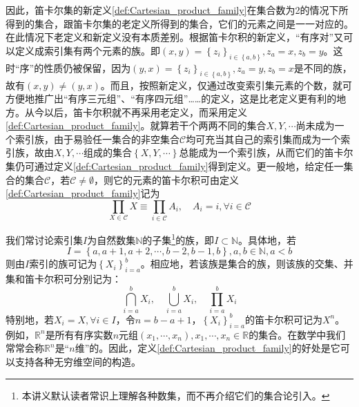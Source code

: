 \documentclass[../main.tex]{subfiles}
\begin{document}

因此，笛卡尔集的新定义\ref{def:Cartesian_product_family}在集合数为2的情况下所得到的集合，跟笛卡尔集的老定义所得到的集合，它们的元素之间是一一对应的。在此情况下老定义和新定义没有本质差别。根据笛卡尔积的新定义，“有序对”又可以定义成索引集有两个元素的族。即$\left(x,y\right)=\left\{z_i\right\}_{i\in\left\{a,b\right\}},z_a=x,z_b=y$。这时“序”的性质仍被保留，因为$\left(y,x\right)=\left\{z_i\right\}_{i\in\left\{a,b\right\}},z_a=y,z_b=x$是不同的族，故有$\left(x,y\right)\neq\left(y,x\right)$。而且，按照新定义，仅通过改变索引集元素的个数，就可方便地推广出“有序三元组”、“有序四元组”……的定义，这是比老定义更有利的地方。从今以后，笛卡尔积就不再采用老定义，而采用定义\ref{def:Cartesian_product_family}。就算若干个两两不同的集合$X,Y,\cdots$尚未成为一个索引族，由于易验任一集合的非空集合$\mathcal{C}$均可充当其自己的索引集而成为一个索引族，故由$X,Y,\cdots$组成的集合$\left\{X,Y,\cdots\right\}$总能成为一个索引族，从而它们的笛卡尔集仍可通过定义\ref{def:Cartesian_product_family}得到定义。更一般地，给定任一集合的集合$\mathcal{C}$，若$\mathcal{C}\neq\emptyset$，则它的元素的笛卡尔积可由定义\ref{def:Cartesian_product_family}记为
\[
    \prod_{X\in\mathcal{C}}X\equiv\prod_{i\in\mathcal{C}}A_i,\quad A_i=i,\forall i\in\mathcal{C}
\]

我们常讨论索引集$I$为自然数集$\mathbb{N}$的子集\footnote{本讲义默认读者常识上理解各种数集，而不再介绍它们的集合论引入。}的族，即$I\subset\mathbb{N}$。具体地，若
\[I=\left\{a,a+1,a+2,\cdots,b-2,b-1,b\right\},a,b\in\mathbb{N},a<b\]则由$I$索引的族可记为$\left\{X_i\right\}_{i=a}^b$。相应地，若该族是集合的族，则该族的交集、并集和笛卡尔积可分别记为：
\[
    \bigcap_{i=a}^b X_i,\quad\bigcup_{i=a}^b X_i,\quad\prod_{i=a}^b X_i
\]
特别地，若$X_i=X,\forall i\in I$，令$n=b-a+1$，$\left\{X_i\right\}_{i=a}^b$的笛卡尔积可记为$X^n$。例如，$\mathbb{R}^n$是所有有序实数$n$元组$\left(x_1,\cdots,x_n\right),x_1,\cdots,x_n\in\mathbb{R}$的集合。在数学中我们常常会称$\mathbb{R}^n$是“$n$维”的。因此，定义\ref{def:Cartesian_product_family}的好处是它可以支持各种无穷维空间的构造。
\end{document}
